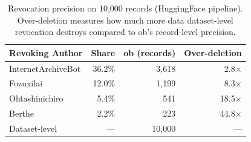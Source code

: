 \begin{table}[b]
	\centering
	\small
	\caption{Revocation precision on 10,000 records (HuggingFace pipeline). Over-deletion measures how much more data dataset-level revocation destroys compared to ob's record-level precision.}
	\label{tab:revocation}
	\setlength{\tabcolsep}{3.5pt}
	\begin{tabular}{@{}lrrr@{}}
		\toprule
		Revoking Author    & Share  & ob (records) & Over-deletion \\
		\midrule
		InternetArchiveBot & 36.2\% & 3,618        & 2.8$\times$   \\
		Fozuxilai            & 12.0\%  & 1,199        & 8.3$\times$   \\
		Ohtashinichiro     & 5.4\%  & 541          & 18.5$\times$  \\
		Berthe              & 2.2\%  & 223          & 44.8$\times$  \\
		\midrule
		Dataset-level      & ---    & 10,000       & ---           \\
		\bottomrule
	\end{tabular}
\end{table}
